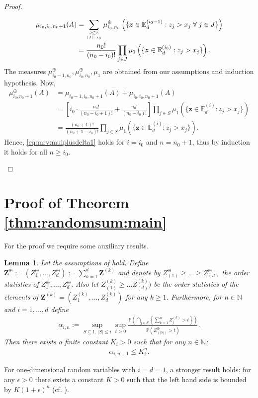 \documentclass[aos]{imsart}
\numberwithin{equation}{section}
\theoremstyle{plain} %
\newtheorem{lemma}[theorem]{Lemma}
\theoremstyle{remark}
\newcommand{\beao}{\begin{eqnarray*}}
\newcommand{\eeao}{\end{eqnarray*}\noindent}
\newcommand{\E}{\mathbb{E}}
\newcommand{\N}{\mathbb{N}}
\renewcommand\P{\mathbb{P}}
\def\bZ{\boldsymbol Z}
\def\bz{\boldsymbol z}
\begin{document}
\begin{proof}
\begin{enumerate}[(1)]
\begin{align*}
 \mu_{i_0,i_0,n_0+1}(A) & = \sum_{\genfrac{}{}{0pt}{}{J\subseteq S}{|J|=i_0}} \mu_{i_0,n_0}^{\oplus} \,\Big(\{\bz\in\E_d^{(i_0-1)}: z_{j}>x_{j} \;\forall\;j\in J\}\Big) \\
& = \frac{n_0!}{(n_0-i_0)!}\prod_{j\in J}
    \mu_1\left(\{\bz\in \E_d^{(i_0)}:z_j>x_j\}\right).
\end{align*}
The measures $\mu_{i_0-1,n_0}^{\oplus},\mu_{i_0,n_0}^{\oplus}, \mu_1 $ are obtained from our assumptions and induction hypothesis. Now,
\begin{align*}
\mu_{i_0,n_0+1}^{\oplus}(A)& = \mu_{i_0-1,i_0,n_0+1}(A)+\mu_{i_0,i_0,n_0+1}(A)\\
   & = \left[ i_0 \cdot \frac{n_0!}{(n_0-i_0+1)!} + \frac{n_0!}{(n_0-i_0)!} \right] \prod_{j\in S}
    \mu_1\left(\{\bz\in \E_d^{(i)}:z_j>x_j\}\right)\\
    & = \frac{(n_0+1)!}{(n_0+1-i_0)!} \prod_{j\in S}
    \mu_1\left(\{\bz\in \E_d^{(i)}:z_j>x_j\}\right).
\end{align*}
Hence, \eqref{eq:mrv:muiplusdelta1} holds for $i=i_0$ and $n=n_0+1$, thus by induction it holds for all $n\ge i_0$.
\end{enumerate}
\end{proof}
\section{Proof of  Theorem \ref{thm:randomsum:main}} \label{sec:proofmainrandomsum}

For the proof we require some auxiliary results.
\begin{lemma} \label{aux_1}
Let the assumptions of  hold. Define $\bZ^{\oplus}:=(Z^{\oplus}_1,\ldots, Z^{\oplus}_d):=\sum_{k=1}^{d}\bZ^{(k)}$
and denote by  
$Z^{\oplus}_{(1)}\geq \ldots \geq Z^{\oplus}_{(d)}$
 the order statistics of
$Z^{\oplus}_1,\ldots, Z^{\oplus}_d$. Also {let $Z_{(1)}^{(k)}\geq\ldots Z_{(d)}^{(k)})$ be the order statistics of the elements of $\bZ^{(k)}=(Z_{1}^{(k)},\ldots, Z_{d}^{(k)})$ for any $k\ge 1$.} Furthermore,
 for $n\in\N$ and $i=1,\ldots,d$ define
\beao
    \alpha_{i,n}:=\sup_{S\subseteq \mathbb{I}, \,
        |S|\leq  i }\sup_{t>0}\frac{\P\left(\bigcap_{j\in S}\left\{\sum_{k=1}^nZ^{(k)}_j>t\right\}\right)}{\P\left(Z^{\oplus}_{(|S|)}>t\right)}.
\eeao
Then  there exists a finite constant $K_i>0$
such that for any $n\in \N$:
\beao
    \alpha_{i,n+1}\leq  K_i^{n}.
\eeao
\end{lemma}
For one-dimensional random variables with $i=d=1$, a stronger result holds: for any $\epsilon>0$ there exists a constant $K>0$ such that the left hand side is bounded by $K(1+\epsilon)^n$ (cf. \cite[Lemma 1.3.5]{embrechts:kluppelberg:mikosch:1997}).
\end{document}
